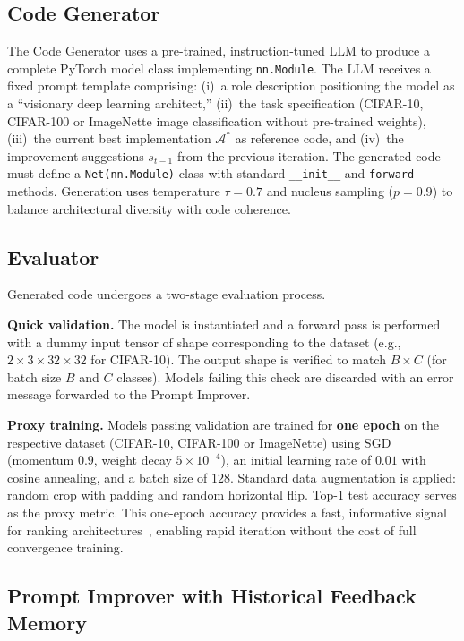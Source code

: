 \documentclass[10pt,twocolumn,letterpaper]{article}
\begin{document}
	\subsection{Code Generator}
	
	The Code Generator uses a pre-trained, instruction-tuned LLM to produce a complete PyTorch model class implementing \texttt{nn.Module}. The LLM receives a fixed prompt template comprising: (i)~a role description positioning the model as a ``visionary deep learning architect,'' (ii)~the task specification (CIFAR-10, CIFAR-100 or ImageNette image classification without pre-trained weights), (iii)~the current best implementation $\mathcal{A}^*$ as reference code, and (iv)~the improvement suggestions $s_{t-1}$ from the previous iteration. The generated code must define a \texttt{Net(nn.Module)} class with standard \texttt{\_\_init\_\_} and \texttt{forward} methods. Generation uses temperature $\tau = 0.7$ and nucleus sampling ($p = 0.9$) to balance architectural diversity with code coherence.
	
	\subsection{Evaluator}
	
	Generated code undergoes a two-stage evaluation process.
	
	\textbf{Quick validation.} The model is instantiated and a forward pass is performed with a dummy input tensor of shape corresponding to the dataset (e.g., $2 \times 3 \times 32 \times 32$ for CIFAR-10). The output shape is verified to match $B \times C$ (for batch size $B$ and $C$ classes). Models failing this check are discarded with an error message forwarded to the Prompt Improver.
	
	\textbf{Proxy training.} Models passing validation are trained for \textbf{one epoch} on the respective dataset (CIFAR-10, CIFAR-100 or ImageNette) using SGD (momentum $0.9$, weight decay $5 \times 10^{-4}$), an initial learning rate of $0.01$ with cosine annealing, and a batch size of $128$. Standard data augmentation is applied: random crop with padding and random horizontal flip. Top-1 test accuracy serves as the proxy metric. This one-epoch accuracy provides a fast, informative signal for ranking architectures~\cite{ru2021speedy}, enabling rapid iteration without the cost of full convergence training.
	
	\subsection{Prompt Improver with Historical Feedback Memory}
	\label{sec:history}
	
\end{document}
